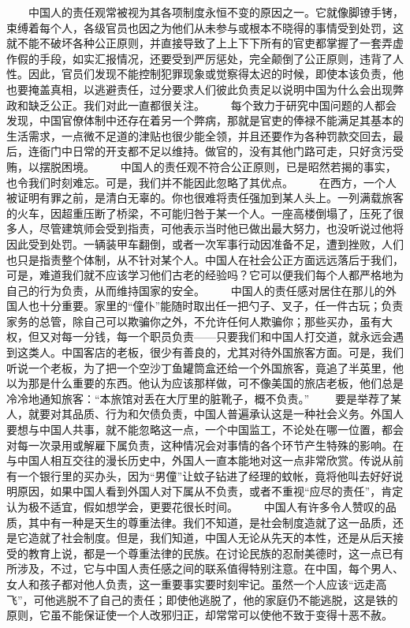 \documentclass[12pt,oneside]{book}
\begin{document}
\begin{common-format}
　　中国人的责任观常被视为其各项制度永恒不变的原因之一。它就像脚镣手铐，束缚着每个人，各级官员也因之为他们从未参与或根本不晓得的事情受到处罚，这就不能不破坏各种公正原则，并直接导致了上上下下所有的官吏都掌握了一套弄虚作假的手段，如实汇报情况，还要受到严厉惩处，完全颠倒了公正原则，违背了人性。因此，官员们发现不能控制犯罪现象或觉察得太迟的时候，即使本该负责，他也要掩盖真相，以逃避责任，过分要求人们彼此负责足以说明中国为什么会出现弊政和缺乏公正。我们对此一直都很关注。 
　　每个致力于研究中国问题的人都会发现，中国官僚体制中还存在着另一个弊病，那就是官吏的俸禄不能满足其基本的生活需求，一点微不足道的津贴也很少能全领，并且还要作为各种罚款交回去，最后，连衙门中日常的开支都不足以维持。做官的，没有其他门路可走，只好贪污受贿，以摆脱困境。 
　　中国人的责任观不符合公正原则，已是昭然若揭的事实，也令我们时刻难忘。可是，我们并不能因此忽略了其优点。 
　　在西方，一个人被证明有罪之前，是清白无辜的。你也很难将责任强加到某人头上。一列满载旅客的火车，因超重压断了桥梁，不可能归咎于某一个人。一座高楼倒塌了，压死了很多人，尽管建筑师会受到指责，可他表示当时他已做出最大努力，也没听说过他将因此受到处罚。一辆装甲车翻倒，或者一次军事行动因准备不足，遭到挫败，人们也只是指责整个体制，从不针对某个人。中国人在社会公正方面远远落后于我们，可是，难道我们就不应该学习他们古老的经验吗？它可以便我们每个人都严格地为自己的行为负责，从而维持国家的安全。 
　　中国人的责任感对居住在那儿的外国人也十分重要。家里的“僮仆”能随时取出任一把勺子、叉子，任一件古玩；负责家务的总管，除自己可以欺骗你之外，不允许任何人欺骗你；那些买办，虽有大权，但又对每一分钱，每一个职员负责——只要我们和中国人打交道，就永远会遇到这类人。中国客店的老板，很少有善良的，尤其对待外国旅客方面。可是，我们听说一个老板，为了把一个空沙丁鱼罐筒盒还给一个外国旅客，竟追了半英里，他以为那是什么重要的东西。他认为应该那样做，可不像美国的旅店老板，他们总是冷冷地通知旅客：“本旅馆对丢在大厅里的脏靴子，概不负责。” 
　　要是举荐了某人，就要对其品质、行为和欠债负责，中国人普遍承认这是一种社会义务。外国人要想与中国人共事，就不能忽略这一点，一个中国监工，不论处在哪一位置，都会对每一次录用或解雇下属负责，这种情况会对事情的各个环节产生特殊的影响。在与中国人相互交往的漫长历史中，外国人一直本能地对这一点非常欣赏。传说从前有一个银行里的买办头，因为“男僮”让蚊子钻进了经理的蚊帐，竟将他叫去好好说明原因，如果中国人看到外国人对下属从不负责，或者不重视“应尽的责任”，肯定认为极不适宜，假如想学会，更要花很长时间。 
　　中国人有许多令人赞叹的品质，其中有一种是天生的尊重法律。我们不知道，是社会制度造就了这一品质，还是它造就了社会制度。但是，我们知道，中国人无论从先天的本性，还是从后天接受的教育上说，都是一个尊重法律的民族。在讨论民族的忍耐美德时，这一点已有所涉及，不过，它与中国人责任感之间的联系值得特别注意。在中国，每个男人、女人和孩子都对他人负责，这一重要事实要时刻牢记。虽然一个人应该“远走高飞”，可他逃脱不了自己的责任；即使他逃脱了，他的家庭仍不能逃脱，这是铁的原则，它虽不能保证使一个人改邪归正，却常常可以使他不致于变得十恶不赦。 

\end{common-format}
\end{document}
